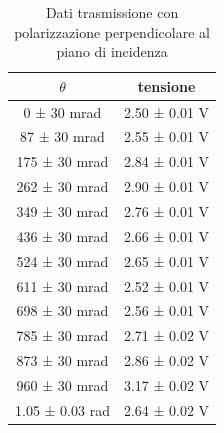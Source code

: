 \documentclass[a4paper]{article}
\begin{document}
\begin{table}[htbp]
\centering
\begin{tabular}{|c|c|}
\hline
$\theta$ & tensione \\\hline\hline
0 ± 30 mrad & 2.50 ± 0.01 V \\
87 ± 30 mrad & 2.55 ± 0.01 V \\
175 ± 30 mrad & 2.84 ± 0.01 V \\
262 ± 30 mrad & 2.90 ± 0.01 V \\
349 ± 30 mrad & 2.76 ± 0.01 V \\
436 ± 30 mrad & 2.66 ± 0.01 V \\
524 ± 30 mrad & 2.65 ± 0.01 V \\
611 ± 30 mrad & 2.52 ± 0.01 V \\
698 ± 30 mrad & 2.56 ± 0.01 V \\
785 ± 30 mrad & 2.71 ± 0.02 V \\
873 ± 30 mrad & 2.86 ± 0.02 V \\
960 ± 30 mrad & 3.17 ± 0.02 V \\
1.05 ± 0.03 rad & 2.64 ± 0.02 V \\
\hline
\end{tabular}
\caption{Dati trasmissione con polarizzazione perpendicolare al piano di incidenza}
\label{tab:brewster2}
\end{table}
\end{document}
